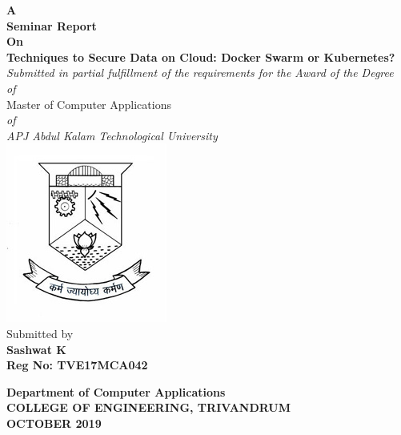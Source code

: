 \begin{titlepage}
\begin{center}
\textbf{ A  }\\
\vspace{0.35cm}
\textbf{ Seminar Report}\\
\vspace{0.35cm}
\textbf{ On  }\\
\vspace{0.55cm}
\textbf{\Large{Techniques to Secure Data on Cloud: Docker Swarm or Kubernetes?}}\\ \vspace{0.5 cm}
\normalsize
\vspace{0.5cm}
\emph{Submitted in partial fulfillment of the requirements for the Award of the Degree}\\
\vspace{0.35cm}
\emph{of}\\
\vspace{0.35cm}
Master of Computer Applications\\
\vspace{0.35cm}
\emph{of}\\
\vspace{0.35cm}
\emph{ {APJ Abdul Kalam Technological University} }\\
\normalsize
\vspace{0.5cm}
\includegraphics[height=0.30\textwidth]{1-title/images/cet.jpg}\\
\vspace{0.3cm}
Submitted by\\
\vspace{0.3cm}
\textbf{Sashwat K}\\
\vspace{0.5cm}
\textbf{Reg No: TVE17MCA042 }\\
\vspace{1.0cm}

\normalsize
\textbf{Department of Computer Applications}\\[0.3cm]
\textbf{COLLEGE OF ENGINEERING, TRIVANDRUM}\\[0.4cm]
\textbf{OCTOBER 2019}\\
\end{center}
\end{titlepage}

